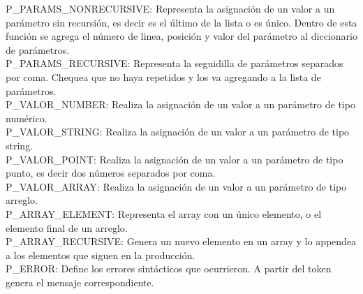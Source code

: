 P_PARAMS_NONRECURSIVE: Representa la asignación de un valor a un parámetro sin recursión, es decir es el último de la lista o es único. Dentro de esta función se agrega
el número de linea, posición y valor del parámetro al diccionario de parámetros.\\

P_PARAMS_RECURSIVE: Representa la seguidilla de parámetros separados por coma. Chequea que no haya repetidos y los va agregando a la lista de parámetros.\\

P_VALOR_NUMBER: Realiza la asignación de un valor a un parámetro de tipo numérico.\\

P_VALOR_STRING: Realiza la asignación de un valor a un parámetro de tipo string.\\

P_VALOR_POINT: Realiza la asignación de un valor a un parámetro de tipo punto, es decir dos números separados por coma.\\

P_VALOR_ARRAY: Realiza la asignación de un valor a un parámetro de tipo arreglo.\\

P_ARRAY_ELEMENT: Representa el array con un único elemento, o el elemento final de un arreglo.\\

P_ARRAY_RECURSIVE: Genera un nuevo elemento en un array y lo appendea a los elementos que siguen en la producción.\\

P_ERROR: Define los errores sintácticos que ocurrieron. A partir del token genera el mensaje correspondiente.\\
